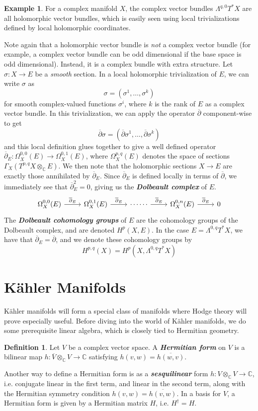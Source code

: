 \documentclass[psamsfonts, 12pt]{amsart}
\theoremstyle{definition}
\newtheorem{defn}[thm]{Definition}
\newtheorem{exmp}[thm]{Example}
\theoremstyle{remark}
\newcommand{\ib}[1]{\textbf{\textit{#1}}}
\newcommand{\C}{\mathbb{C}}
\newcommand{\dbar}{\overline{\partial}}
\begin{document}
%
\begin{exmp}
For a complex manifold $X$, the complex vector bundles $\Lambda^{q,0}T^*X$ are all
holomorphic vector bundles, which is easily seen using local trivializations defined
by local holomorphic coordinates.
\end{exmp}
%
Note again that a holomorphic vector bundle is \emph{not} a complex vector bundle
(for example, a complex vector bundle can be odd dimensional if the base space is
odd dimensional). Instead, it is a complex bundle with extra structure. Let
$\sigma : X \to E$ be a \emph{smooth} section. In a local holomorphic trivialization of
$E$, we can write $\sigma$ as
\[
\sigma = (\sigma^1, \ldots, \sigma^k)
\]
for smooth complex-valued functions $\sigma^i$,  where $k$ is the rank of $E$ as a
complex vector bundle. In this trivialization, we can apply the operator $\dbar$
component-wise to get
\[
\dbar\sigma = (\dbar\sigma^1,\ldots,\dbar\sigma^k)
\]
and this local definition glues together to give a well defined operator
$\dbar_E : \Omega^{0,0}_X(E) \to \Omega^{0,1}_X(E)$, where $\Omega^{p,q}_X(E)$ denotes
the space of sections $\Gamma_X(T^{p,q}X \otimes_\C E)$. We then note that the
holomorphic sections $X \to E$ are exactly those annihilated by $\dbar_E$. Since
$\dbar_E$ is defined locally in terms of $\dbar$, we immediately see that
$\dbar_E^2 = 0$, giving us the
\ib{Dolbeault complex} of $E$.
\[\begin{tikzcd}
\Omega^{0,0}_X(E) \ar[r, "\dbar_E"] & \Omega^{0,1}_X(E) \ar[r, "\dbar_E"] &
\cdots\cdots \ar[r, "\dbar_E"] & \Omega^{0,n}_X(E) \ar[r,"\dbar_E"] & 0
\end{tikzcd}\]
%
The \ib{Dolbeault cohomology groups} of $E$ are the cohomology groups of the
Dolbeault complex, and are denoted $H^p(X,E)$. In the case $E = \Lambda^{0,q}T^*X$,
we have that $\dbar_E = \dbar$, and we denote these cohomology groups by
\[
H^{p,q}(X) = H^p(X,\Lambda^{0,q}T^*X)
\]
%
\section{K\"ahler Manifolds}
%
K\"ahler manifolds will form a special class of manifolds where Hodge theory
will prove especially useful. Before diving into the world of K\"ahler manifolds,
we do some prerequisite linear algebra, which is closely tied to Hermitian geometry.
%
\begin{defn}
Let $V$ be a complex vector space. A \ib{Hermitian form} on $V$ is a bilinear map
$h : \overline{V} \otimes_\C V \to \C$ satisfying $h(v,w) = \overline{h(w,v)}$.
\end{defn}
%
Another way to define a Hermitian form is as a \ib{sesquilinear} form
$h : V \otimes_\C V \to \C$, i.e. conjugate linear in the first term, and linear in the
second term, along with the Hermitian symmetry condition $h(v,w) = \overline{h(v,w)}$.
In a basis for $V$, a Hermitian form is given by a Hermitian matrix $H$, i.e.
$H^\dagger = H$. \\
\end{document}
